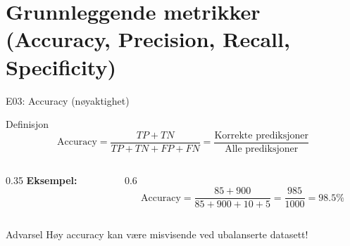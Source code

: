 \documentclass[aspectratio=169, 10pt]{beamer}
\begin{document}
\section{Grunnleggende metrikker (Accuracy, Precision, Recall, Specificity)}

\begin{frame}{E03: Accuracy (nøyaktighet)}

    \begin{block}{Definisjon}
        \[
        \text{Accuracy} = \frac{TP + TN}{TP + TN + FP + FN} = \frac{\text{Korrekte prediksjoner}}{\text{Alle prediksjoner}}
        \]
    \end{block}

    \vspace{1mm}

    \begin{columns}[T]
        \begin{column}{0.35\textwidth}
            \textbf{Eksempel:}
            \begin{center}
            \end{center}
        \end{column}
        \begin{column}{0.6\textwidth}
            \[
            \text{Accuracy} = \frac{85 + 900}{85 + 900 + 10 + 5} = \frac{985}{1000} = 98.5\%
            \]
        \end{column}
    \end{columns}

    \vspace{2mm}

    \begin{alertblock}{Advarsel}
        Høy accuracy kan være misvisende ved ubalanserte datasett!
    \end{alertblock}

\end{frame}
\end{document}
